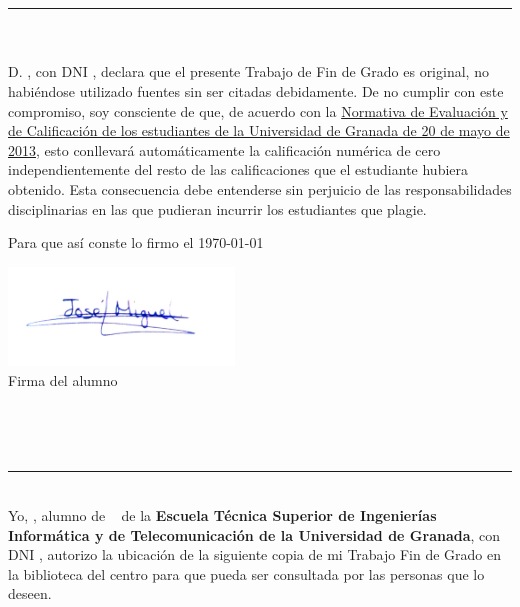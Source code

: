 \begin{center}
{\LARGE\bfseries\titulo}\\
\end{center}
\begin{center}
\autor\
\end{center}

\noindent\rule[-1ex]{\textwidth}{2pt}\\[4.5ex]
\\

D. \textbf{\autor}, con DNI \dni, declara que el presente Trabajo de Fin de Grado es original, no habiéndose utilizado fuentes sin ser citadas debidamente. De no cumplir con este compromiso, soy consciente de que, de acuerdo con la  \href{http://secretariageneral.ugr.es/bougr/pages/bougr71/ncg712/}{Normativa de Evaluación y de Calificación de los estudiantes de la Universidad de Granada de 20 de mayo de 2013}, esto conllevará automáticamente la calificación numérica de cero independientemente del resto de las calificaciones que el estudiante hubiera obtenido. Esta consecuencia debe entenderse sin perjuicio de las responsabilidades disciplinarias en las que pudieran incurrir los estudiantes que plagie.

\bigskip
\noindent Para que así conste lo firmo el  \today\\

\vspace{1cm}
\begin{center}
\includegraphics[width=0.45\textwidth]{../images/firmaJM.jpg}\\

Firma del alumno
\end{center}


\newpage
\begin{center}
{\LARGE\bfseries\titulo}\\
\end{center}
\begin{center}
\autor\
\end{center}
\noindent\rule[-1ex]{\textwidth}{2pt}\\[4.5ex]

Yo, \textbf{\autor}, alumno de \grado ~ de la \textbf{Escuela Técnica Superior de Ingenierías Informática y de Telecomunicación de la Universidad de Granada}, con DNI \dni, autorizo la ubicación de la siguiente copia de mi Trabajo Fin de Grado en la biblioteca del centro para que pueda ser consultada por las personas que lo deseen.

